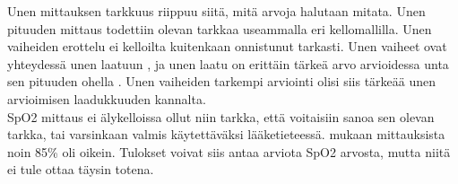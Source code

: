 \documentclass[utf8,bachelor,finnish]{bachelor}
\begin{document}
Unen mittauksen tarkkuus riippuu siitä, mitä arvoja halutaan mitata. Unen pituuden mittaus todettiin olevan tarkkaa useammalla eri kellomallilla.
 Unen vaiheiden erottelu ei kelloilta kuitenkaan onnistunut tarkasti. Unen vaiheet ovat yhteydessä unen laatuun \parencite{krystal_measuring_2008},
  ja unen laatu on erittäin tärkeä arvo arvioidessa unta sen pituuden ohella \parencite{kohyama_which_2021}. Unen vaiheiden
   tarkempi arviointi olisi siis tärkeää unen arvioimisen laadukkuuden kannalta.\\
  
SpO2 mittaus ei älykelloissa ollut niin tarkka, että voitaisiin sanoa sen olevan tarkka, tai varsinkaan valmis käytettäväksi lääketieteessä.
 \textcite{patz_accuracy_2023} mukaan mittauksista noin 85\% oli oikein. Tulokset voivat siis antaa arviota SpO2 arvosta, mutta niitä ei tule ottaa
  täysin totena.





\printbibliography
\end{document}
